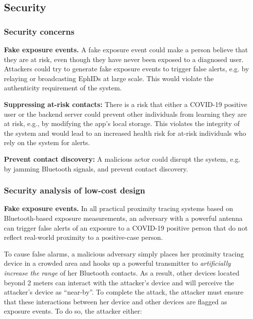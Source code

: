 \documentclass{article}
\begin{document}
\subsection{Security}\label{security}

\subsubsection{Security concerns}\label{security-concerns}

\textbf{Fake exposure events.} A fake exposure event could make a person
believe that they are at risk, even though they have never been exposed
to a diagnosed user. Attackers could try to generate fake exposure
events to trigger false alerts, e.g. by relaying or broadcasting EphIDs
at large scale. This would violate the authenticity requirement of the
system.

\textbf{Suppressing at-risk contacts:} There is a risk that either a
COVID-19 positive user or the backend server could prevent other
individuals from learning they are at risk, e.g., by modifying the app's
local storage. This violates the integrity of the system and would lead
to an increased health risk for at-risk individuals who rely on the
system for alerts.

\textbf{Prevent contact discovery:} A malicious actor could disrupt the
system, e.g. by jamming Bluetooth signals, and prevent contact
discovery.

\hypertarget{security-analysis-of-low-cost-design}{%
\subsubsection{Security analysis of low-cost
design}\label{security-analysis-of-low-cost-design}}

\textbf{Fake exposure events.} In all practical proximity tracing
systems based on Bluetooth-based exposure measurements, an adversary
with a powerful antenna can trigger false alerts of an exposure to a
COVID-19 positive person that do not reflect real-world proximity to a
positive-case person.

To cause false alarms, a malicious adversary simply places her proximity
tracing device in a crowded area and hooks up a powerful transmitter to
\emph{artificially increase the range} of her Bluetooth contacts. As a
result, other devices located beyond 2 meters can interact with the
attacker's device and will perceive the attacker's device as
``near-by''. To complete the attack, the attacker must ensure that these
interactions between her device and other devices are flagged as
exposure events. To do so, the attacker either:
\end{document}
